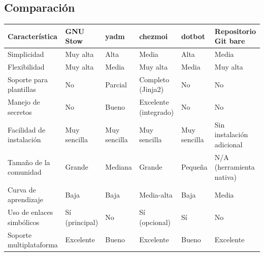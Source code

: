 \documentclass[
  doc,
  floatsintext,
  longtable,
  a4paper,
  nolmodern,
  notxfonts,
  notimes,
  12pt,
  colorlinks=true,linkcolor=blue,citecolor=blue,urlcolor=blue]{apa7}
\newcounter{none} %
\begin{document}
\subsection{Comparación}\label{comparaciuxf3n}

{\def\LTcaptype{none} %
\begin{longtable}[]{@{}
  >{\raggedright\arraybackslash}p{}
  >{\raggedright\arraybackslash}p{}
  >{\raggedright\arraybackslash}p{}
  >{\raggedright\arraybackslash}p{}
  >{\raggedright\arraybackslash}p{}
  >{\raggedright\arraybackslash}p{}@{}}
\toprule\noalign{}
\begin{minipage}[b]{\linewidth}\raggedright
Característica
\end{minipage} & \begin{minipage}[b]{\linewidth}\raggedright
GNU Stow
\end{minipage} & \begin{minipage}[b]{\linewidth}\raggedright
yadm
\end{minipage} & \begin{minipage}[b]{\linewidth}\raggedright
chezmoi
\end{minipage} & \begin{minipage}[b]{\linewidth}\raggedright
dotbot
\end{minipage} & \begin{minipage}[b]{\linewidth}\raggedright
Repositorio Git bare
\end{minipage} \\
\midrule\noalign{}
\endhead
\bottomrule\noalign{}
\endlastfoot
Simplicidad & Muy alta & Alta & Media & Alta & Media \\
Flexibilidad & Muy alta & Media & Muy alta & Media & Muy alta \\
Soporte para plantillas & No & Parcial & Completo (Jinja2) & No & No \\
Manejo de secretos & No & Bueno & Excelente (integrado) & No & No \\
Facilidad de instalación & Muy sencilla & Muy sencilla & Muy sencilla &
Muy sencilla & Sin instalación adicional \\
Tamaño de la comunidad & Grande & Mediana & Grande & Pequeña & N/A
(herramienta nativa) \\
Curva de aprendizaje & Baja & Baja & Media-alta & Baja & Media \\
Uso de enlaces simbólicos & Sí (principal) & No & Sí (opcional) & Sí &
No \\
Soporte multiplataforma & Excelente & Bueno & Excelente & Bueno &
Excelente \\
\end{longtable}
}
\end{document}
